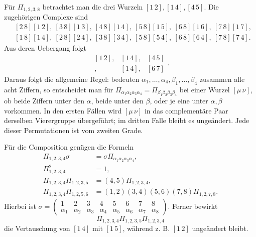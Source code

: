 \documentclass[11pt]{article}
\providecommand{\pair}[2]{[#1\,#2]}
\begin{document}
Für \(\Pi_{1,2,3,8}\) betrachtet man die drei Wurzeln \(\pair{1}{2},\pair{1}{4},\pair{4}{5}\). Die zugehörigen Complexe sind
\begin{align}
&\pair{2}{8}\pair{1}{2},\ \pair{3}{8}\pair{1}{3},\ \pair{4}{8}\pair{1}{4},\ \pair{5}{8}\pair{1}{5},\ \pair{6}{8}\pair{1}{6},\ \pair{7}{8}\pair{1}{7}, \tag{5}\\
&\pair{1}{8}\pair{1}{4},\ \pair{2}{8}\pair{2}{4},\ \pair{3}{8}\pair{3}{4},\ \pair{5}{8}\pair{5}{4},\ \pair{6}{8}\pair{6}{4},\ \pair{7}{8}\pair{7}{4}. \tag{6}
\end{align}
Aus deren Uebergang folgt
\begin{equation}
 \begin{array}{ccc}
 \pair{1}{2},&\pair{1}{4},&\pair{4}{5}\\
 \pair{3}{8},&\pair{1}{4},&\pair{6}{7}
 \end{array} . \tag{7}
\end{equation}
Daraus folgt die allgemeine Regel: bedeuten \(\alpha_1,
\ldots,\alpha_4,\beta_1,
\ldots,\beta_4\) zusammen alle acht Ziffern, so entscheidet man für \(\Pi_{\alpha_1\alpha_2\alpha_3\alpha_4}=\Pi_{\beta_1\beta_2\beta_3\beta_4}\) bei einer Wurzel \(\pair{\mu}{\nu}\), ob beide Ziffern unter den \(\alpha\), beide unter den \(\beta\), oder je eine unter \(\alpha,\beta\) vorkommen. In den ersten Fällen wird \(\pair{\mu}{\nu}\) in das complementäre Paar derselben Vierergruppe übergeführt; im dritten Falle bleibt es ungeändert. Jede dieser Permutationen ist vom zweiten Grade.

Für die Composition genügen die Formeln
\begin{align}
 \Pi_{1,2,3,4}\sigma&=\sigma\Pi_{\alpha_1\alpha_2\alpha_3\alpha_4}, \tag{8}\\
 \Pi_{1,2,3,4}^2&=1, \tag{9}\\
 \Pi_{1,2,3,4}\Pi_{1,2,3,5}&=(4,5)\Pi_{1,2,3,4}, \tag{10}\\
 \Pi_{1,2,3,4}\Pi_{1,2,5,6}&=(1,2)(3,4)(5,6)(7,8)\Pi_{1,2,7,8}. \tag{11}
\end{align}
Hierbei ist \(\sigma=\begin{pmatrix}1&2&3&4&5&6&7&8\\ \alpha_1&\alpha_2&\alpha_3&\alpha_4&\alpha_5&\alpha_6&\alpha_7&\alpha_8\end{pmatrix}\). Ferner bewirkt
\begin{equation}
 \Pi_{1,2,3,4}\Pi_{1,2,3,5}\Pi_{1,2,3,4} \tag{12}
\end{equation}
die Vertauschung von \(\pair{1}{4}\) mit \(\pair{1}{5}\), während z. B. \(\pair{1}{2}\) ungeändert bleibt.
\end{document}
